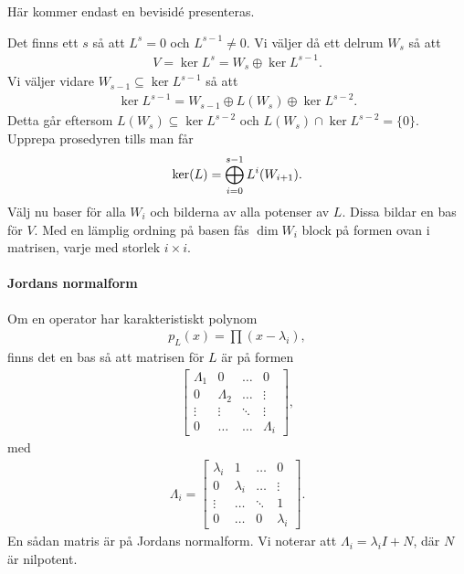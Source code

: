 \proof
Här kommer endast en bevisidé presenteras.

Det finns ett $s$ så att $L^{s} = 0$ och $L^{s - 1} \neq 0$. Vi väljer då ett delrum $W_{s}$ så att
\begin{align*}
	V = \ker{L^{s}} = W_{s} \oplus \ker{L^{s - 1}}.
\end{align*}
Vi väljer vidare $W_{s - 1}\subseteq\ker{L^{s - 1}}$ så att
\begin{align*}
	\ker{L^{s - 1}} = W_{s - 1} \oplus L(W_{s}) \oplus \ker{L^{s - 2}}.
\end{align*}
Detta går eftersom $L(W_{s}) \subseteq \ker{L^{s - 2}}$ och $L(W_{s}) \cap \ker{L^{s - 2}} = \{0\}$. Upprepa prosedyren tills man får
\begin{align*}
	\text{ker}(L) = \bigoplus\limits_{i = 0}^{s - 1}L^{i}(W_{i + 1}).
\end{align*}
Välj nu baser för alla $W_{i}$ och bilderna av alla potenser av $L$. Dissa bildar en bas för $V$. Med en lämplig ordning på basen fås $\dim{W_{i}}$ block på formen ovan i matrisen, varje med storlek $i\times i$.

\paragraph{Jordans normalform}
Om en operator har karakteristiskt polynom
\begin{align*}
	p_{L}(x) = \prod (x - \lambda_{i}),
\end{align*}
finns det en bas så att matrisen för $L$ är på formen
\begin{align*}
	\left[\begin{array}{cccc}
		\Lambda_{1} & 0           & \dots  & 0 \\
		0           & \Lambda_{2} & \dots  & \vdots \\
		\vdots      & \vdots      & \ddots & \vdots \\
		0           & \dots       & \dots  & \Lambda_{i}
	\end{array}\right],
\end{align*}
med 
\begin{align*}
	\Lambda_{i} =
	\left[\begin{array}{cccc}
		\lambda_{i} & 1           & \dots       & 0 \\
		0           & \lambda_{i} & \dots       & \vdots \\
		\vdots      & \dots       & \ddots      & 1 \\
		0           & \dots       & 0           & \lambda_{i}
	\end{array}\right].
\end{align*}
En sådan matris är på Jordans normalform. Vi noterar att $\Lambda_{i} = \lambda_{i}I + N$, där $N$ är nilpotent.

\proof
